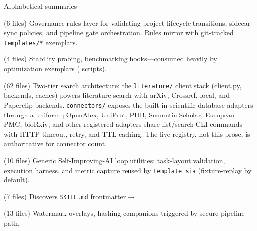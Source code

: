\documentclass[
  ignorenonframetext,
]{beamer}
\begin{document}
\begin{frame}{Alphabetical summaries}
\begin{block}{ (6 files)}
\protect{}\label{infrastructure.rules-6-files}
Governance rules layer for validating project lifecycle transitions,
sidecar sync policies, and pipeline gate orchestration. Rules mirror
 with git-tracked \texttt{templates/*}
exemplars.
\end{block}

\begin{block}{ (4 files)}
\protect{}\label{infrastructure.scientific-4-files}
Stability probing, benchmarking hooks---consumed heavily by optimization
exemplars ( scripts).
\end{block}

\begin{block}{ (62 files)}
\protect{}\label{infrastructure.search-62-files}
Two-tier search architecture: the \texttt{literature/} client stack
(client.py, backends, caches) powers literature search with arXiv,
Crossref, local, and Paperclip backends. \texttt{connectors/} exposes
the built-in scientific database adapters through a uniform
; OpenAlex, UniProt, PDB, Semantic Scholar,
European PMC, bioRxiv, and other registered adapters share list/search
CLI commands with HTTP timeout, retry, and TTL caching. The live
registry, not this prose, is authoritative for connector count.
\end{block}

\begin{block}{ (10 files)}
\protect{}\label{infrastructure.sia-10-files}
Generic Self-Improving-AI loop utilities: task-layout validation,
execution harness, and metric capture reused by \texttt{template\_sia}
(fixture-replay by default).
\end{block}

\begin{block}{ (7 files)}
\protect{}\label{infrastructure.skills-7-files}
Discovers \texttt{SKILL.md} frontmatter →
.
\end{block}

\begin{block}{ (13 files)}
\protect{}\label{infrastructure.steganography-13-files}
Watermark overlays, hashing companions triggered by secure pipeline
path.
\end{block}


\end{frame}
\end{document}
